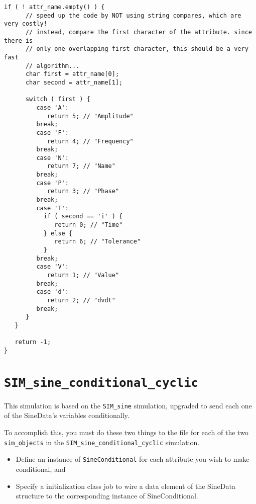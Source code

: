 \begin{lstlisting}[caption={{\tt SineConditional} code},label={list:sine-conditional-code}]
   if ( ! attr_name.empty() ) {
      // speed up the code by NOT using string compares, which are very costly!
      // instead, compare the first character of the attribute. since there is
      // only one overlapping first character, this should be a very fast
      // algorithm...
      char first = attr_name[0];
      char second = attr_name[1];

      switch ( first ) {
         case 'A':
            return 5; // "Amplitude"
         break;
         case 'F':
            return 4; // "Frequency"
         break;
         case 'N':
            return 7; // "Name"
         break;
         case 'P':
            return 3; // "Phase"
         break;
         case 'T':
           if ( second == 'i' ) {
              return 0; // "Time"
           } else {
              return 6; // "Tolerance"
           }
         break;
         case 'V':
            return 1; // "Value"
         break;
         case 'd':
            return 2; // "dvdt"
         break;
      }
   }
   
   return -1;
}
\end{lstlisting}

\section{\tt SIM\_sine\_conditional\_cyclic}

This simulation is based on the {\tt SIM\_sine} simulation, upgraded to send each
one of the SineData's variables conditionally.

To accomplish this, you must do these two things to the \sdefine file for each
of the two {\tt sim\_objects} in the {\tt SIM\_sine\_conditional\_cyclic} simulation.

\begin{itemize}
\item{
  Define an instance of {\tt SineConditional} for each attribute you wish to make
  conditional, and
}
\item{
  Specify a initialization class job to wire a data element of the SineData
  structure to the corresponding instance of SineConditional.
}
\end{itemize}

